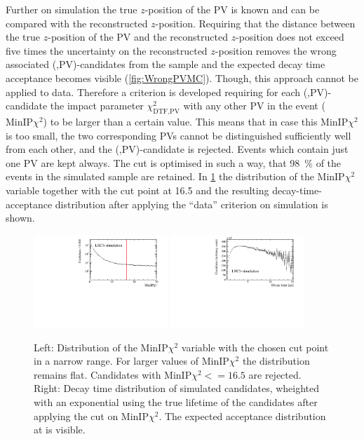 Further on simulation the true $z$-position of the \ac{PV} is known and can be compared with the reconstructed $z$-position.
Requiring that the distance between the true $z$-position of the \ac{PV} and the reconstructed $z$-position does not exceed five times the uncertainty on the reconstructed $z$-position removes the wrong associated (\Bz,\ac{PV})-candidates from the sample and the expected decay time acceptance becomes visible (\cref{fig:WrongPVMC}).
Though, this approach cannot be applied to data.
Therefore a criterion is developed requiring for each (\Bz,\ac{PV})-candidate the impact parameter $\chi^2_{\text{DTF,PV}}$ with any other \ac{PV} in the event ($\text{MinIP}\chi^2$) to be larger than a certain value.
This means that in case this $\text{MinIP}\chi^2$ is too small, the two corresponding \ac{PV}s cannot be distinguished sufficiently well from each other, and the (\Bz,\ac{PV})-candidate is rejected.
Events which contain just one \ac{PV} are kept always.
The cut is optimised in such a way, that \SI{98}{\percent} of the events in the simulated \BdToDpi sample are retained.
In \cref{fig:WrongPVData} the distribution of the $\text{MinIP}\chi^2$ variable together with the cut point at \num{16.5} and the resulting decay-time-acceptance distribution after applying the \enquote{data} criterion on simulation is shown.
\begin{figure}[tbp]
    \centering
    \includegraphics[width=0.45\textwidth]{06selection/figs/MinIPCHI2.pdf}
    \includegraphics[width=0.45\textwidth]{06selection/figs/WrongPVs-WeightingGoodData.pdf}
    \caption{Left: Distribution of the $\text{MinIP}\chi^2$ variable with the chosen cut point in a narrow range.
    For larger values of $\text{MinIP}\chi^2$ the distribution remains flat.
    Candidates with $\text{MinIP}\chi^2<=16.5$ are rejected.
    Right: Decay time distribution of simulated \BdToDpi candidates, wheighted with an exponential using the true lifetime of the \Bz candidates after applying the cut on $\text{MinIP}\chi^2$.
    The expected acceptance distribution at \lhcb is visible.}
    \label{fig:WrongPVData}
\end{figure}

